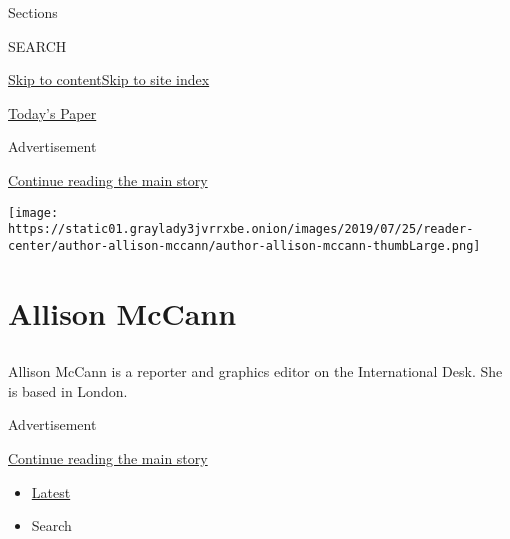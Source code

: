 Sections

SEARCH

\protect\hyperlink{site-content}{Skip to
content}\protect\hyperlink{site-index}{Skip to site index}

\href{https://myaccount.nytimes3xbfgragh.onion/auth/login?response_type=cookie\&client_id=vi}{}

\href{https://www.nytimes3xbfgragh.onion/section/todayspaper}{Today's
Paper}

Advertisement

\protect\hyperlink{after-top}{Continue reading the main story}

\texttt{[image: https://static01.graylady3jvrrxbe.onion/images/2019/07/25/reader-center/author-allison-mccann/author-allison-mccann-thumbLarge.png]}

\hypertarget{allison-mccann}{%
\section{Allison McCann}\label{allison-mccann}}

\subsection{}

Allison McCann is a reporter and graphics editor on the International
Desk. She is based in London.

Advertisement

\protect\hyperlink{after-mid1}{Continue reading the main story}

\begin{itemize}
\tightlist
\item
  \protect\hyperlink{stream-panel}{Latest}
\item
  Search
\end{itemize}

